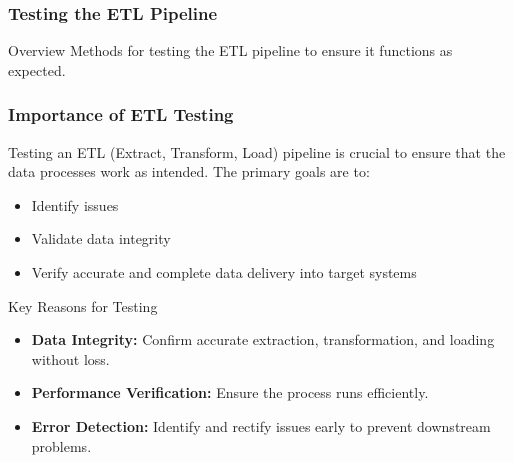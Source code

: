 \documentclass[aspectratio=169]{beamer}
\begin{document}
\begin{frame}
    \frametitle{Testing the ETL Pipeline}
    \begin{block}{Overview}
        Methods for testing the ETL pipeline to ensure it functions as expected.
    \end{block}
\end{frame}

\begin{frame}
    \frametitle{Importance of ETL Testing}
    
    Testing an ETL (Extract, Transform, Load) pipeline is crucial to ensure that the data processes work as intended. The primary goals are to:
    \begin{itemize}
        \item Identify issues
        \item Validate data integrity
        \item Verify accurate and complete data delivery into target systems
    \end{itemize}
    
    \begin{block}{Key Reasons for Testing}
        \begin{itemize}
            \item \textbf{Data Integrity:} Confirm accurate extraction, transformation, and loading without loss.
            \item \textbf{Performance Verification:} Ensure the process runs efficiently.
            \item \textbf{Error Detection:} Identify and rectify issues early to prevent downstream problems.
        \end{itemize}
    \end{block}
\end{frame}
\end{document}
